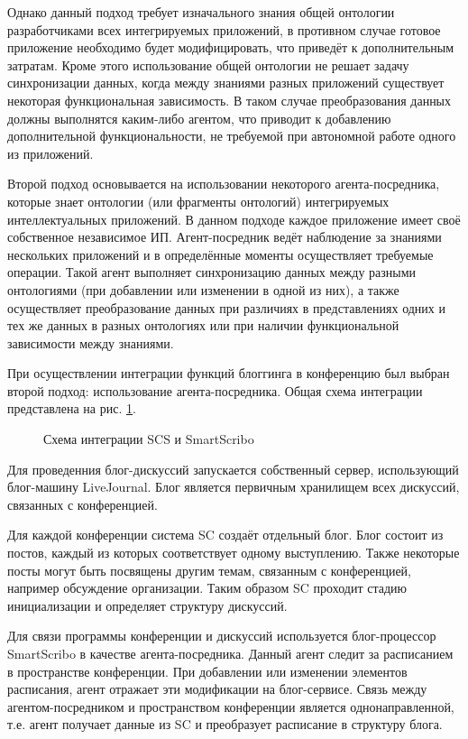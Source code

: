 Однако данный подход требует изначального знания общей онтологии разработчиками всех интегрируемых приложений, в противном случае готовое приложение необходимо будет модифицировать, что приведёт к дополнительным затратам.
Кроме этого использование общей онтологии не решает задачу синхронизации данных, когда между знаниями разных приложений существует некоторая функциональная зависимость. В таком случае преобразования данных должны выполнятся каким-либо агентом, что приводит к добавлению дополнительной функциональности, не требуемой при автономной работе одного из приложений.

Второй подход основывается на использовании некоторого агента-посредника, которые знает онтологии (или фрагменты онтологий) интегрируемых интеллектуальных приложений. В данном подходе каждое приложение имеет своё собственное независимое ИП. Агент-посредник ведёт наблюдение за знаниями нескольких приложений и в определённые моменты осуществляет требуемые операции. Такой агент выполняет синхронизацию данных между разными онтологиями (при добавлении или изменении в одной из них), а также осуществляет преобразование данных при различиях в представлениях одних и тех же данных в разных онтологиях или при наличии функциональной зависимости между знаниями.



При осуществлении интеграции функций блоггинга в конференцию был выбран второй подход: использование агента-посредника. Общая схема интеграции представлена на рис. \ref{scs-architecture}.
\begin{figure}[h]
\centerline{
}
\caption{Схема интеграции SCS и SmartScribo}
\label{scs-architecture}
\end{figure}

Для проведенния блог-дискуссий запускается собственный сервер, использующий блог-машину LiveJournal. Блог является первичным хранилищем всех дискуссий, связанных с конференцией.

Для каждой конференции система SC создаёт отдельный блог. Блог состоит из постов, каждый из которых соответствует одному выступлению. Также некоторые посты могут быть посвящены другим темам, связанным с конференцией, например обсуждение организации. Таким образом SC проходит стадию инициализации и определяет структуру дискуссий.

Для связи программы конференции и дискуссий используется блог-процессор SmartScribo в качестве агента-посредника. Данный агент следит за расписанием в пространстве конференции. При добавлении или изменении элементов расписания, агент отражает эти модификации на блог-сервисе. Связь между агентом-посредником и пространством конференции является однонаправленной, т.е. агент получает данные из SC и преобразует расписание в структуру блога.

